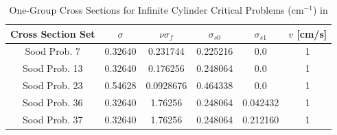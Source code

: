 \begin{table}[!htbp]
	\caption{One-Group Cross Sections for Infinite Cylinder Critical Problems (cm$^{-1}$) in \cite{sood2003analytical}}
	\label{table:SoodCyl}
	\centering{}
    \begin{tabular}{*6c}
        \toprule
	Cross Section Set & $\sigma$ & $\nu \sigma_{f}$ & $\sigma_{s0}$ & $\sigma_{s1}$ & $v$ [cm/s] \\ 
        \midrule
	Sood Prob. 7 & 0.32640 & 0.231744 & 0.225216 & 0.0 & 1 \\
	Sood Prob. 13 & 0.32640 & 0.176256 & 0.248064 & 0.0 & 1 \\
	Sood Prob. 23 & 0.54628 & 0.0928676 & 0.464338 & 0.0 & 1 \\
	Sood Prob. 36 & 0.32640 & 1.76256 & 0.248064 & 0.042432 & 1 \\
	Sood Prob. 37 & 0.32640 & 1.76256 & 0.248064 & 0.212160 & 1 \\
        \bottomrule
    \end{tabular}
\end{table}

